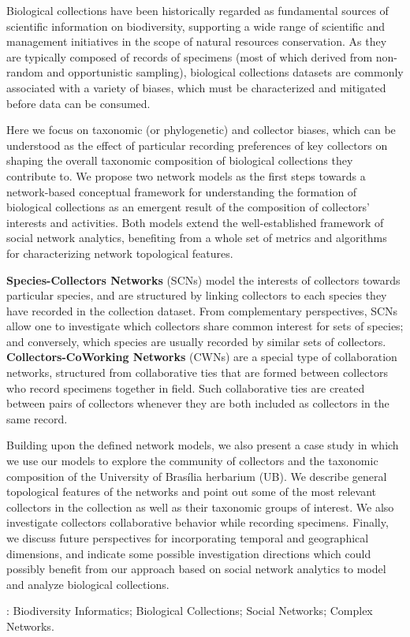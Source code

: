\documentclass[
	12pt,				%
	openright,			%
	oneside,			%
	a4paper,			%
	sumario=tradicional,%
	french,				%
	spanish,			%
	brazil,				%
    english
	]{abntex2}
\begin{document}
\setlength{\absparsep}{18pt} %
\begin{resumo}
Biological collections have been historically regarded as fundamental sources of scientific information on biodiversity, supporting a wide range of scientific and management initiatives in the scope of natural resources conservation. As they are typically composed of records of specimens (most of which derived from non-random and opportunistic sampling), biological collections datasets are commonly associated with a variety of biases, which must be characterized and mitigated before data can be consumed.

Here we focus on taxonomic (or phylogenetic) and collector biases, which can be understood as the effect of particular recording preferences of key collectors on shaping the overall taxonomic composition of biological collections they contribute to. We propose two network models as the first steps towards a network-based conceptual framework for understanding the formation of biological collections as an emergent result of the composition of collectors' interests and activities. Both models extend the well-established framework of social network analytics, benefiting from a whole set of metrics and algorithms for characterizing network topological features.

\textbf{Species-Collectors Networks} (SCNs) model the interests of collectors towards particular species, and are structured by linking collectors to each species they have recorded in the collection dataset. From complementary perspectives, SCNs allow one to investigate which collectors share common interest  for sets of species; and conversely, which species are usually recorded by similar sets of collectors.
\textbf{Collectors-CoWorking Networks} (CWNs) are a special type of collaboration networks, structured from collaborative ties  that are formed between collectors who record specimens together in field. Such collaborative ties are created between pairs of collectors whenever they are both included as collectors in the same record.

Building upon the defined network models, we also present a case study in which we use our models to explore the community of collectors and the taxonomic composition of the University of Brasília herbarium (UB). We describe general topological features of the networks and point out some of the most relevant collectors in the collection as well as their taxonomic groups of interest. We also investigate collectors collaborative behavior while recording specimens.
Finally, we discuss future perspectives for incorporating temporal and geographical dimensions, and indicate some possible investigation directions which could possibly benefit from our approach based on social network analytics to model and analyze biological collections.


 \textbf{\palavrasChave}: Biodiversity Informatics; Biological Collections; Social Networks; Complex Networks.
\end{resumo}
\end{document}
